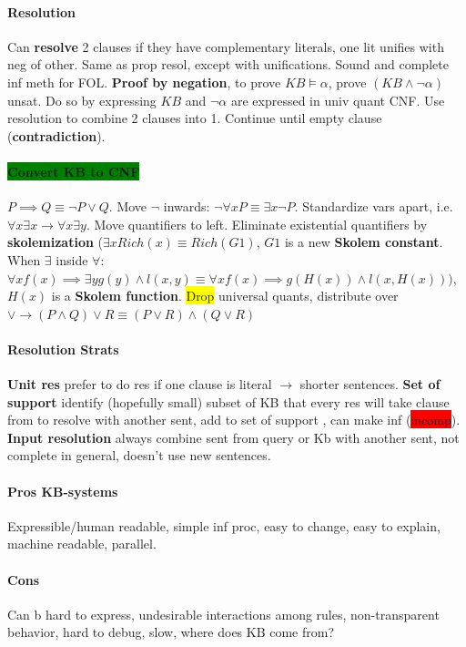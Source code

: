 \paragraph{Resolution} Can \textbf{resolve} 2 clauses if they have
complementary literals, one lit unifies with neg of other. Same as
prop resol, except with unifications. Sound and complete inf meth for
FOL. \textbf{Proof by negation}, to prove $KB \models \alpha$, prove
$(KB \land \neg \alpha)$ unsat. Do so by expressing $KB$ and $\neg
\alpha$ are expressed in univ quant CNF. Use resolution to combine 2
clauses into 1.  Continue until empty clause (\textbf{contradiction}).
\paragraph{\colorbox{green}{Convert KB to CNF}} $P \implies Q \equiv
\neg P \lor Q$. Move $\neg$ inwards: $\neg \forall x P \equiv \exists
x \neg P$. Standardize vars apart, i.e. $\forall x \exists x \to
\forall x \exists  y$. Move quantifiers to left. Eliminate existential
quantifiers by \textbf{skolemization} ($\exists x Rich(x) \equiv
Rich(G1)$, $G1$ is a new \textbf{Skolem constant}. When $\exists$
inside $\forall$: $\forall x f(x) \implies \exists y g(y) \land l(x,y)
\equiv \forall x f(x) \implies g(H(x))\land l(x,H(x)))$, $H(x)$ is a
\textbf{Skolem function}. \colorbox{yellow}{Drop} universal quants,
distribute over $\lor \to (P \land Q) \lor R \equiv (P \lor R) \land
(Q \lor R)$
\paragraph{Resolution Strats} \textbf{Unit res} prefer to do res if
one clause is literal $\to$ shorter sentences. \textbf{Set of support}
identify (hopefully small) subset of KB that every res will take
clause from to resolve with another sent, add to set of support
, can make inf (\colorbox{red}{incomp}). \textbf{Input resolution}
always combine sent from query or Kb with another sent, not complete
in general, doesn't use new sentences.
\paragraph{Pros KB-systems} Expressible/human readable, simple inf
proc, easy to change, easy to explain, machine readable, parallel.
\paragraph{Cons} Can b hard to express, undesirable interactions among
rules, non-transparent behavior, hard to debug, slow, where does KB
come from?
